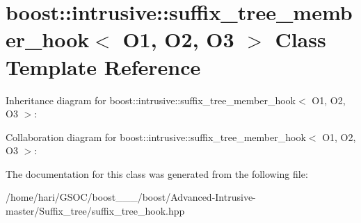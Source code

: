 \hypertarget{classboost_1_1intrusive_1_1suffix__tree__member__hook}{}\section{boost\+:\+:intrusive\+:\+:suffix\+\_\+tree\+\_\+member\+\_\+hook$<$ O1, O2, O3 $>$ Class Template Reference}
\label{classboost_1_1intrusive_1_1suffix__tree__member__hook}


Inheritance diagram for boost\+:\+:intrusive\+:\+:suffix\+\_\+tree\+\_\+member\+\_\+hook$<$ O1, O2, O3 $>$\+:


Collaboration diagram for boost\+:\+:intrusive\+:\+:suffix\+\_\+tree\+\_\+member\+\_\+hook$<$ O1, O2, O3 $>$\+:


The documentation for this class was generated from the following file\+:\begin{DoxyCompactItemize}
\item 
/home/hari/\+G\+S\+O\+C/boost\+\_\+\_\+\_/boost/\+Advanced-\/\+Intrusive-\/master/\+Suffix\+\_\+tree/suffix\+\_\+tree\+\_\+hook.\+hpp\end{DoxyCompactItemize}
